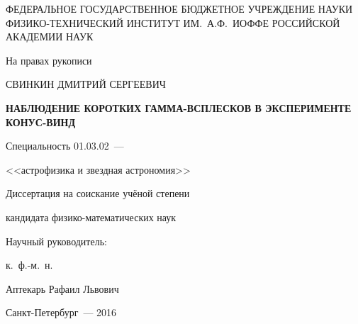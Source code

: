 \thispagestyle{empty}

\begin{center}
{\small
ФЕДЕРАЛЬНОЕ ГОСУДАРСТВЕННОЕ БЮДЖЕТНОЕ УЧРЕЖДЕНИЕ НАУКИ\\
ФИЗИКО-ТЕХНИЧЕСКИЙ ИНСТИТУТ ИМ.~А.Ф.~ИОФФЕ РОССИЙСКОЙ АКАДЕМИИ НАУК\\
}
\end{center}

\vspace{20mm}
\begin{flushright}
На правах рукописи

\end{flushright}

\vspace{20mm}
\begin{center}
{\large СВИНКИН ДМИТРИЙ СЕРГЕЕВИЧ}
\end{center}

\vspace{5mm}
\begin{center}
{\bf \large НАБЛЮДЕНИЕ КОРОТКИХ ГАММА-ВСПЛЕСКОВ В ЭКСПЕРИМЕНТЕ КОНУС-ВИНД
\par}

\vspace{10mm}
{%
Специальность 01.03.02~---

<<астрофизика и звездная астрономия>>
}

\vspace{10mm}
Диссертация на соискание учёной степени

кандидата физико-математических наук
\end{center}

\vspace{10mm}
\begin{flushright}
Научный руководитель:

к.~ф.-м.~н.

Аптекарь Рафаил Львович
\end{flushright}

\vspace{20mm}
\begin{center}
{Санкт-Петербург~--- 2016}
\end{center}

\newpage